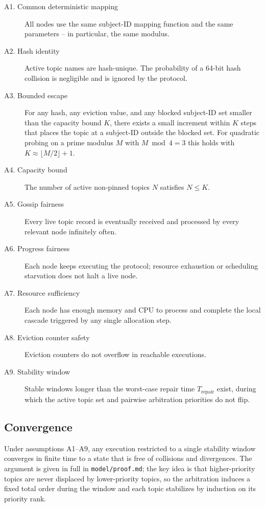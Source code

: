\begin{description}
    \item[A1. Common deterministic mapping] All nodes use the same subject-ID
    mapping function and the same parameters -- in particular, the same modulus.
    \item[A2. Hash identity] Active topic names are hash-unique. The probability of
    a 64-bit hash collision is negligible and is ignored by the protocol.
    \item[A3. Bounded escape] For any hash, any eviction value, and any blocked
    subject-ID set smaller than the capacity bound $K$, there exists a small
    increment within $K$ steps that places the topic at a subject-ID outside the
    blocked set. For quadratic probing on a prime modulus $M$ with $M \bmod 4 = 3$
    this holds with $K \approx \lfloor M / 2 \rfloor + 1$.
    \item[A4. Capacity bound] The number of active non-pinned topics $N$ satisfies
    $N \le K$.
    \item[A5. Gossip fairness] Every live topic record is eventually received and
    processed by every relevant node infinitely often.
    \item[A6. Progress fairness] Each node keeps executing the protocol; resource
    exhaustion or scheduling starvation does not halt a live node.
    \item[A7. Resource sufficiency] Each node has enough memory and CPU to process
    and complete the local cascade triggered by any single allocation step.
    \item[A8. Eviction counter safety] Eviction counters do not overflow in
    reachable executions.
    \item[A9. Stability window] Stable windows longer than the worst-case repair
    time $T_{\mathrm{repair}}$ exist, during which the active topic set and
    pairwise arbitration priorities do not flip.
\end{description}

\subsection{Convergence}

Under assumptions A1--A9, any execution restricted to a single stability window
converges in finite time to a state that is free of collisions and divergences.
The argument is given in full in \texttt{model/proof.md}; the key idea is that
higher-priority topics are never displaced by lower-priority topics, so the
arbitration induces a fixed total order during the window and each topic
stabilizes by induction on its priority rank.


